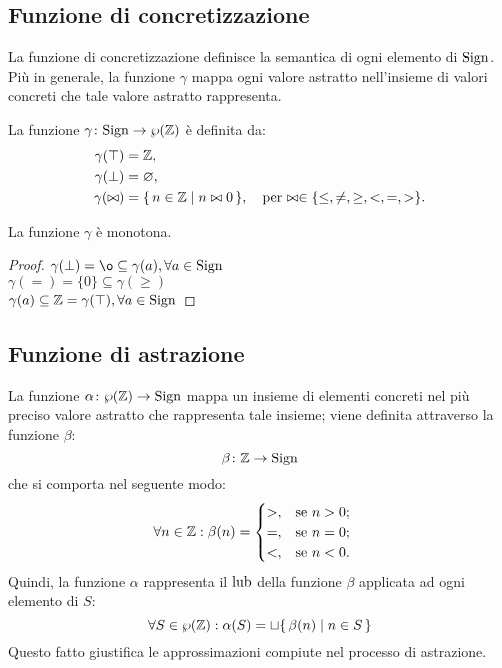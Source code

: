 \subsection{Funzione di concretizzazione}

La funzione di concretizzazione definisce la semantica di ogni
elemento di $\mathrm{Sign}$. Più in generale, la funzione $\gamma$ mappa ogni
valore astratto nell'insieme di valori concreti che tale valore astratto
rappresenta.
\begin{definizione} 
La funzione $\mathord{\gamma}\colon\mathrm{Sign}\to\wp(\mathbb{Z})$ è definita
da:
\begin{align*}
  \gamma(\top) &= \mathbb{Z}, \\
  \gamma(\bot) &= \varnothing, \\
  \gamma(\bowtie) &= \{\, n \in \mathbb{Z} \mid n \bowtie 0 \,\},
    \quad\text{per $\bowtie \in \{ \leq, \neq, \geq, <, =, > \}$.}
\end{align*}
\end{definizione}

\begin{proposizione}
La funzione $\gamma$ è monotona.
\end{proposizione}
\begin{proof}
	$ \gamma(\bot) = \o \subseteq \gamma(a) , \forall a \in \Sign $ \\
	$ \gamma(=) = \{0\} \subseteq \gamma(\geq) $ \\
	$ \gamma(a) \subseteq \mathbb{Z} = \gamma(\top), \forall a \in \mathrm{Sign} $
\end{proof}

\subsection{Funzione di astrazione}

\begin{definizione} 
La funzione $\mathord{\alpha}\colon\wp(\mathbb{Z})\to\mathrm{Sign}$ mappa un insieme
di elementi concreti nel più preciso valore astratto che rappresenta
tale insieme; viene definita attraverso la funzione $\beta$:
\[
	\mathord{\beta}\colon\mathbb{Z}\to\mathrm{Sign}
\]
che si comporta nel seguente modo:
\begin{align*}
	\forall n \in \mathbb{Z} \mathrel{:} \beta(n) &=
	\begin{cases}
		>,	&\text{se $n  >  0$;} \\
		=,	&\text{se $n = 0$;} \\
		<,	&\text{se $n < 0$.}
	\end{cases} 
\end{align*}
Quindi, la funzione $\alpha$ rappresenta il $\mathop{\mathrm{lub}}\nolimits$ della
funzione $\beta$ applicata ad ogni elemento di $S$:
\[
	\forall S \in \wp(\mathbb{Z}) \mathrel{:} \alpha(S) = \sqcup \{\, \beta(n) \mid n \in S \,\}
\]
Questo fatto giustifica le approssimazioni compiute nel processo
di astrazione.
\end{definizione}

